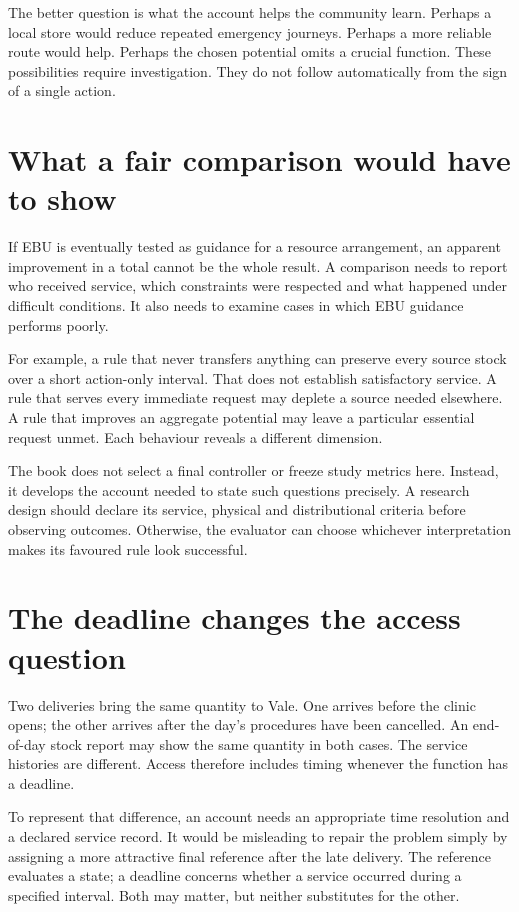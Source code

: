 The better question is what the account helps the community learn. Perhaps a local store would reduce repeated emergency journeys. Perhaps a more reliable route would help. Perhaps the chosen potential omits a crucial function. These possibilities require investigation. They do not follow automatically from the sign of a single action.

\section{What a fair comparison would have to show}
If EBU is eventually tested as guidance for a resource arrangement, an apparent improvement in a total cannot be the whole result. A comparison needs to report who received service, which constraints were respected and what happened under difficult conditions. It also needs to examine cases in which EBU guidance performs poorly.

For example, a rule that never transfers anything can preserve every source stock over a short action-only interval. That does not establish satisfactory service. A rule that serves every immediate request may deplete a source needed elsewhere. A rule that improves an aggregate potential may leave a particular essential request unmet. Each behaviour reveals a different dimension.

The book does not select a final controller or freeze study metrics here. Instead, it develops the account needed to state such questions precisely. A research design should declare its service, physical and distributional criteria before observing outcomes. Otherwise, the evaluator can choose whichever interpretation makes its favoured rule look successful.

\section{The deadline changes the access question}
Two deliveries bring the same quantity to Vale. One arrives before the clinic opens; the other arrives after the day's procedures have been cancelled. An end-of-day stock report may show the same quantity in both cases. The service histories are different. Access therefore includes timing whenever the function has a deadline.

To represent that difference, an account needs an appropriate time resolution and a declared service record. It would be misleading to repair the problem simply by assigning a more attractive final reference after the late delivery. The reference evaluates a state; a deadline concerns whether a service occurred during a specified interval. Both may matter, but neither substitutes for the other.

